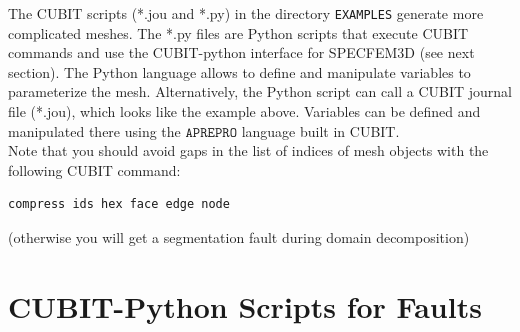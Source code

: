 \noindent
The CUBIT scripts ({*}.jou and {*}.py) in the directory \texttt{EXAMPLES}
generate more complicated meshes. The {*}.py files are Python scripts
that execute CUBIT commands and use the CUBIT-python interface for
SPECFEM3D (see next section). The Python language allows to define
and manipulate variables to parameterize the mesh. Alternatively,
the Python script can call a CUBIT journal file ({*}.jou), which looks
like the example above. Variables can be defined and manipulated there
using the $\mathtt{APREPRO}$ language built in CUBIT.\\

\newpage
\noindent
Note that you should avoid gaps in the list of indices of mesh objects
with the following CUBIT command:

{\footnotesize
\begin{verbatim}
compress ids hex face edge node
\end{verbatim}
}
\noindent
(otherwise you will get a segmentation fault during domain decomposition)


\section{CUBIT-Python Scripts for Faults}

